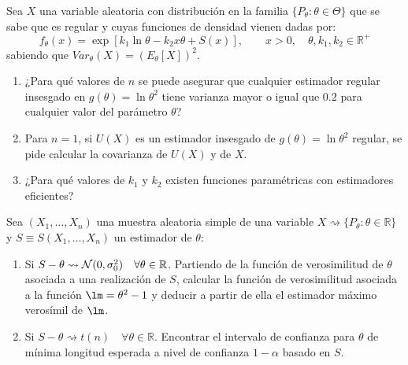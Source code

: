 \documentclass[12pt]{article}
\begin{document}
    \begin{ejercicio}[2 puntos]
        Sea $X$ una variable aleatoria con distribución en la familia $\{P_\theta:\theta \in \Theta\}$ que se sabe que es regular y cuyas funciones de densidad vienen dadas por:
        \begin{equation*}
            f_\theta(x) = \exp[k_1 \ln\theta - k_2 x \theta + S(x)], \qquad x>0, \quad \theta,k_1,k_2\in \mathbb{R}^+
        \end{equation*}
        sabiendo que $Var_\theta(X) = {(E_\theta[X])}^{2}$.
        \begin{enumerate}[label=\alph*)]
            \item ¿Para qué valores de $n$ se puede asegurar que cualquier estimador regular insesgado en $g(\theta) = \ln\theta^2$ tiene varianza mayor o igual que $0.2$ para cualquier valor del parámetro $\theta$?
            \item Para $n=1$, si $U(X)$ es un estimador insesgado de $g(\theta)=\ln\theta^2$ regular, se pide calcular la covarianza de $U(X)$ y de $X$.
            \item ¿Para qué valores de $k_1$ y $k_2$ existen funciones paramétricas con estimadores eficientes?
        \end{enumerate}
    \end{ejercicio}

    \begin{ejercicio}[1.85 puntos]
        Sea $(X_1,\ldots,X_n)$ una muestra aleatoria simple de una variable $X\rightsquigarrow \{P_\theta:\theta \in \mathbb{R}\}$ y $S\equiv S(X_1,\ldots,X_n)$ un estimador de $\theta$:
        \begin{enumerate}[label=\alph*)]
            \item Si $S-\theta\rightsquigarrow \mathcal{N}(0,\sigma_0^2)\quad \forall \theta\in \mathbb{R}$. Partiendo de la función de verosimilitud de $\theta$ asociada a una realización de $S$, calcular la función de verosimilitud asociada a la función $\lm = \theta^2-1$ y deducir a partir de ella el estimador máximo verosímil de $\lm$.
            \item Si $S-\theta \rightsquigarrow t(n)\quad \forall \theta \in \mathbb{R}$. Encontrar el intervalo de confianza para $\theta$ de mínima longitud esperada a nivel de confianza $1-\alpha$ basado en $S$.
        \end{enumerate}
    \end{ejercicio}
\end{document}
